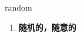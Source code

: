 
\begin{frame}
{\huge random}
\begin{center}
\begin{enumerate}\Large
  \item \textbf{随机的，随意的}
\end{enumerate}
\end{center}
\end{frame}

